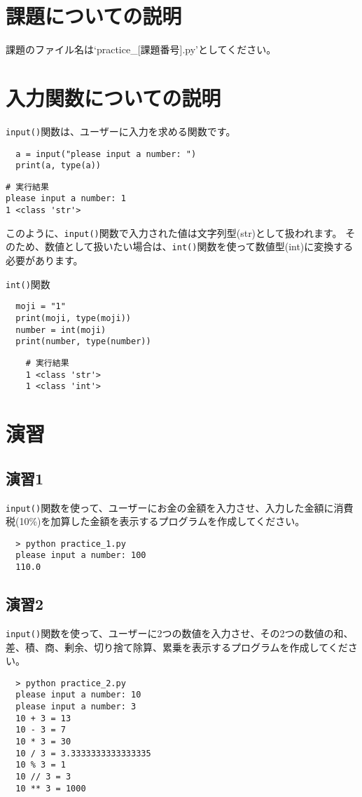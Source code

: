 \documentclass[a4paper,titlepage,dvipdfmx]{jarticle}
\begin{document}
\section{課題についての説明}
課題のファイル名は`practice\_[課題番号].py'としてください。

\section{入力関数についての説明}
\texttt{input()}関数は、ユーザーに入力を求める関数です。
\begin{lstlisting}
  a = input("please input a number: ")
  print(a, type(a))
\end{lstlisting}
\begin{lstlisting}
# 実行結果
please input a number: 1
1 <class 'str'>
\end{lstlisting}
このように、\texttt{input()}関数で入力された値は文字列型(str)として扱われます。
そのため、数値として扱いたい場合は、\texttt{int()}関数を使って数値型(int)に変換する必要があります。
\begin{itembox}[l]{\texttt{int()}関数}
  \begin{lstlisting}
  moji = "1"
  print(moji, type(moji))
  number = int(moji)
  print(number, type(number))
  \end{lstlisting}
  \begin{lstlisting}
    # 実行結果
    1 <class 'str'>
    1 <class 'int'>
  \end{lstlisting}
\end{itembox}


\section{演習}
\subsection*{演習1}
\texttt{input()}関数を使って、ユーザーにお金の金額を入力させ、入力した金額に消費税(10\%)を加算した金額を表示するプログラムを作成してください。
\begin{lstlisting}
  > python practice_1.py
  please input a number: 100
  110.0
\end{lstlisting}

\subsection*{演習2}
\texttt{input()}関数を使って、ユーザーに2つの数値を入力させ、その2つの数値の和、差、積、商、剰余、切り捨て除算、累乗を表示するプログラムを作成してください。
\begin{lstlisting}
  > python practice_2.py
  please input a number: 10
  please input a number: 3
  10 + 3 = 13
  10 - 3 = 7
  10 * 3 = 30
  10 / 3 = 3.3333333333333335
  10 % 3 = 1
  10 // 3 = 3
  10 ** 3 = 1000
\end{lstlisting}
\end{document}
